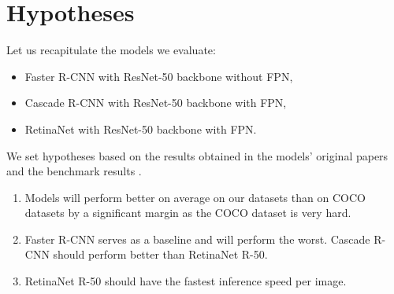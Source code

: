 \section{Hypotheses}
Let us recapitulate the models we evaluate:
\begin{itemize}
	\item Faster R-CNN with ResNet-50 backbone without FPN,
	\item Cascade R-CNN with ResNet-50 backbone with FPN,
	\item RetinaNet with ResNet-50 backbone with FPN.
\end{itemize}
We set hypotheses based on the results obtained in the models' original papers
\cite{fasterrcnn,cascadercnn,retinanet} and the  benchmark
results \cite{detectron}.
\renewcommand{\theenumi}{\alph{enumi}}
\begin{enumerate}
	\item Models will perform better on average on our datasets than on COCO
	      datasets \cite{coco} by a significant margin as the COCO dataset is
	      very hard.
	\item Faster R-CNN serves as a baseline and will perform the worst. Cascade
	      R-CNN should perform better than RetinaNet R-50.
	\item RetinaNet R-50 should have the fastest inference speed per image.
\end{enumerate}

